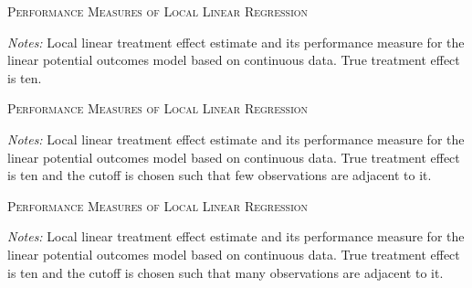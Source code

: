 \documentclass[11pt, a4paper, leqno]{article}
\begin{document}
\begin{table}
\centering

	

\caption{\textsc{Performance Measures of Local Linear Regression}}
\label{tab:perform_meas_table_linear_nonparametric_discrete_False}
\medskip
\raggedright
\footnotesize
\textit{Notes:} Local linear treatment effect estimate and its performance measure for the linear potential outcomes model based on continuous data. True treatment effect is ten. \\
\end{table}


\begin{table}
	\centering

	

	\caption{\textsc{Performance Measures of Local Linear Regression}}
	\label{tab:perform_meas_table_linear_nonparametric_discrete_False_c_1}
	\medskip
	\raggedright
	\footnotesize
	\textit{Notes:} Local linear treatment effect estimate and its performance measure for the linear potential outcomes model based on continuous data. True treatment effect is ten and the cutoff is chosen such that few observations are adjacent to it. \\
\end{table}


\begin{table}
	\centering

	

	\caption{\textsc{Performance Measures of Local Linear Regression}}
	\label{tab:perform_meas_table_linear_nonparametric_discrete_False_c_10}
	\medskip
	\raggedright
	\footnotesize
	\textit{Notes:} Local linear treatment effect estimate and its performance measure for the linear potential outcomes model based on continuous data. True treatment effect is ten and the cutoff is chosen such that many observations are adjacent to it. \\
\end{table}







\end{document}

